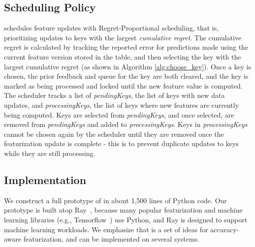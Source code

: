 \subsection{Scheduling Policy}
\label{ss:design:scheduler}
%
\system{} schedules feature updates with Regret-Proportional scheduling, that is, prioritizing updates to keys with the largest \textit{cumulative regret}. The cumulative regret is calculated by tracking the reported error for predictions made using the current feature version stored in the table, and then selecting the key with the largest cumulative regret (as shown in Algorithm \ref{alg:choose_key}). Once a key is chosen, the prior feedback and queue for the key are both cleared, and the key is marked as being processed and locked until the new feature value is computed. The scheduler tracks a list of \textit{pendingKeys}, the list of keys with new data updates, and \textit{processingKeys}, the list of keys where new features are currently being computed. Keys are selected from \textit{pendingKeys}, and once selected, are removed from \textit{pendingKeys} and added to \textit{processingKeys}. Keys in \textit{processingKeys} cannot be chosen again by the scheduler until they are removed once the featurization update is complete - this is to prevent duplicate updates to keys while they are still processing. 


\subsection{Implementation}
\label{ss:design:implementation}
%
%
%
We construct a full prototype of \system{} in about 1,500 lines of Python code.
%
Our prototype is built atop Ray~\cite{ray}, because many
popular featurization and machine learning libraries (e.g., Tensorflow~\cite{tensorflow})
use Python, and Ray is designed to support machine learning workloads.
%
We emphasize that \system{} is a set of ideas for accuracy-aware featurization, and
can be implemented on several systems. 

%
%
%

